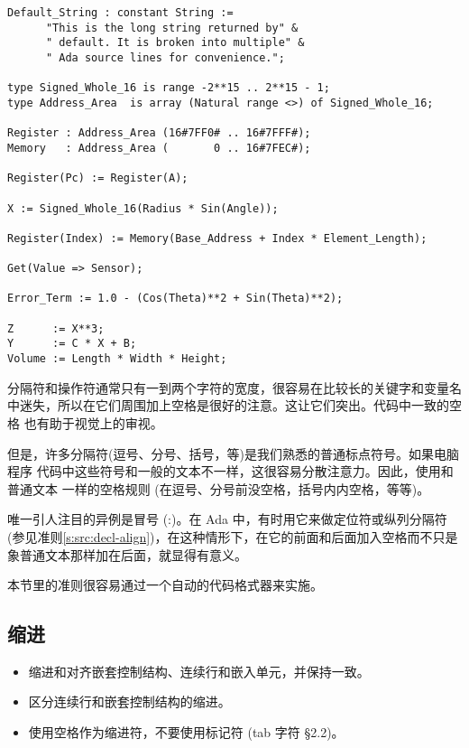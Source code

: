 \begin{blockindent}
\begin{lstlisting}
Default_String : constant String :=
      "This is the long string returned by" &
      " default. It is broken into multiple" &
      " Ada source lines for convenience.";

type Signed_Whole_16 is range -2**15 .. 2**15 - 1;
type Address_Area  is array (Natural range <>) of Signed_Whole_16;

Register : Address_Area (16#7FF0# .. 16#7FFF#);
Memory   : Address_Area (       0 .. 16#7FEC#);

Register(Pc) := Register(A);

X := Signed_Whole_16(Radius * Sin(Angle));

Register(Index) := Memory(Base_Address + Index * Element_Length);

Get(Value => Sensor);

Error_Term := 1.0 - (Cos(Theta)**2 + Sin(Theta)**2);

Z      := X**3;
Y      := C * X + B;
Volume := Length * Width * Height;
\end{lstlisting}

\end{blockindent}

\begin{blockindent}
分隔符和操作符通常只有一到两个字符的宽度，很容易在比较长的关键字和变量名
中迷失，所以在它们周围加上空格是很好的注意。这让它们突出。代码中一致的空格
也有助于视觉上的审视。

但是，许多分隔符(逗号、分号、括号，等)是我们熟悉的普通标点符号。如果电脑程序
代码中这些符号和一般的文本不一样，这很容易分散注意力。因此，使用和普通文本
一样的空格规则 (在逗号、分号前没空格，括号内内空格，等等)。

\end{blockindent}

\begin{blockindent}
唯一引人注目的异例是冒号 (:)。在 Ada 中，有时用它来做定位符或纵列分隔符
(参见准则\ref{s:src:decl-align})，在这种情形下，在它的前面和后面加入空格而不只是
象普通文本那样加在后面，就显得有意义。
\end{blockindent}

\begin{blockindent}
本节里的准则很容易通过一个自动的代码格式器来实施。
\end{blockindent}

\subsection{缩进}
\begin{itemize}
    \item 缩进和对齐嵌套控制结构、连续行和嵌入单元，并保持一致。
    \item 区分连续行和嵌套控制结构的缩进。
    \item 使用空格作为缩进符，不要使用标记符 (tab 字符\cite{nissen84}
\S{}2.2)。
\end{itemize}

